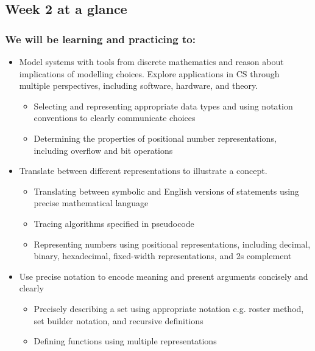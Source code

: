 

\subsection*{Week 2 at a glance}

\subsubsection*{We will be learning and practicing to:}
\begin{itemize}
\item Model systems with tools from discrete mathematics and reason about implications of modelling choices. Explore applications in CS through multiple perspectives, including software, hardware, and theory.
\begin{itemize}
   \item Selecting and representing appropriate data types and using notation conventions to clearly communicate choices
   \item Determining the properties of positional number representations, including overflow and bit operations
\end{itemize}

\item Translate between different representations to illustrate a concept.

\begin{itemize}
   \item Translating between symbolic and English versions of statements using precise mathematical language
   \item Tracing algorithms specified in pseudocode
   \item Representing numbers using positional representations, including decimal, binary, hexadecimal, fixed-width representations, and 2s complement
\end{itemize}


\item Use precise notation to encode meaning and present arguments concisely and clearly
\begin{itemize}
    \item Precisely describing a set using appropriate notation e.g. roster method, set builder notation, and recursive definitions
    \item Defining functions using multiple representations
\end{itemize}


\end{itemize}

